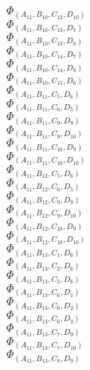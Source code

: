\documentclass[14pt]{article}
\begin{document}
    $\Phi_{({A}_{11}, {B}_{10}, {C}_{12}, {D}_{10})}$ \\ 
    $\Phi_{({A}_{11}, {B}_{10}, {C}_{13}, {D}_{7})}$ \\ 
    $\Phi_{({A}_{11}, {B}_{10}, {C}_{13}, {D}_{8})}$ \\ 
    $\Phi_{({A}_{11}, {B}_{10}, {C}_{14}, {D}_{7})}$ \\ 
    $\Phi_{({A}_{11}, {B}_{10}, {C}_{14}, {D}_{8})}$ \\ 
    $\Phi_{({A}_{11}, {B}_{10}, {C}_{15}, {D}_{6})}$ \\ 
    $\Phi_{({A}_{11}, {B}_{11}, {C}_{5}, {D}_{6})}$ \\ 
    $\Phi_{({A}_{11}, {B}_{11}, {C}_{6}, {D}_{5})}$ \\ 
    $\Phi_{({A}_{11}, {B}_{11}, {C}_{9}, {D}_{9})}$ \\ 
    $\Phi_{({A}_{11}, {B}_{11}, {C}_{9}, {D}_{10})}$ \\ 
    $\Phi_{({A}_{11}, {B}_{11}, {C}_{10}, {D}_{9})}$ \\ 
    $\Phi_{({A}_{11}, {B}_{11}, {C}_{10}, {D}_{10})}$ \\ 
    $\Phi_{({A}_{11}, {B}_{12}, {C}_{5}, {D}_{6})}$ \\ 
    $\Phi_{({A}_{11}, {B}_{12}, {C}_{6}, {D}_{5})}$ \\ 
    $\Phi_{({A}_{11}, {B}_{12}, {C}_{9}, {D}_{9})}$ \\ 
    $\Phi_{({A}_{11}, {B}_{12}, {C}_{9}, {D}_{10})}$ \\ 
    $\Phi_{({A}_{11}, {B}_{12}, {C}_{10}, {D}_{9})}$ \\ 
    $\Phi_{({A}_{11}, {B}_{12}, {C}_{10}, {D}_{10})}$ \\ 
    $\Phi_{({A}_{11}, {B}_{13}, {C}_{1}, {D}_{6})}$ \\ 
    $\Phi_{({A}_{11}, {B}_{13}, {C}_{2}, {D}_{6})}$ \\ 
    $\Phi_{({A}_{11}, {B}_{13}, {C}_{3}, {D}_{6})}$ \\ 
    $\Phi_{({A}_{11}, {B}_{13}, {C}_{6}, {D}_{1})}$ \\ 
    $\Phi_{({A}_{11}, {B}_{13}, {C}_{6}, {D}_{2})}$ \\ 
    $\Phi_{({A}_{11}, {B}_{13}, {C}_{6}, {D}_{3})}$ \\ 
    $\Phi_{({A}_{11}, {B}_{13}, {C}_{7}, {D}_{9})}$ \\ 
    $\Phi_{({A}_{11}, {B}_{13}, {C}_{7}, {D}_{10})}$ \\ 
    $\Phi_{({A}_{11}, {B}_{13}, {C}_{8}, {D}_{9})}$ \\ 
\end{document}
